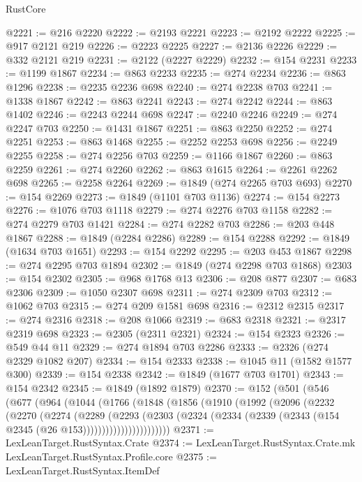 \begin{lexlean}{RustCore}
\begin{coremodule}
@2221 := @216 @2220
@2222 := @2193 @2221
@2223 := @2192 @2222
@2225 := @917 @2121 @219
@2226 := @2223 @2225
@2227 := @2136 @2226
@2229 := @332 @2121 @219
@2231 := @2122 (@2227 @2229)
@2232 := @154 @2231
@2233 := @1199 @1867
@2234 := @863 @2233
@2235 := @274 @2234
@2236 := @863 @1296
@2238 := @2235 @2236 @698
@2240 := @274 @2238 @703
@2241 := @1338 @1867
@2242 := @863 @2241
@2243 := @274 @2242
@2244 := @863 @1402
@2246 := @2243 @2244 @698
@2247 := @2240 @2246
@2249 := @274 @2247 @703
@2250 := @1431 @1867
@2251 := @863 @2250
@2252 := @274 @2251
@2253 := @863 @1468
@2255 := @2252 @2253 @698
@2256 := @2249 @2255
@2258 := @274 @2256 @703
@2259 := @1166 @1867
@2260 := @863 @2259
@2261 := @274 @2260
@2262 := @863 @1615
@2264 := @2261 @2262 @698
@2265 := @2258 @2264
@2269 := @1849 (@274 @2265 @703 @693)
@2270 := @154 @2269
@2273 := @1849 (@1101 @703 @1136)
@2274 := @154 @2273
@2276 := @1076 @703 @1118
@2279 := @274 @2276 @703 @1158
@2282 := @274 @2279 @703 @1421
@2284 := @274 @2282 @703
@2286 := @203 @448 @1867
@2288 := @1849 (@2284 @2286)
@2289 := @154 @2288
@2292 := @1849 (@1634 @703 @1651)
@2293 := @154 @2292
@2295 := @203 @453 @1867
@2298 := @274 @2295 @703 @1894
@2302 := @1849 (@274 @2298 @703 @1868)
@2303 := @154 @2302
@2305 := @968 @1768 @13
@2306 := @208 @877
@2307 := @683 @2306
@2309 := @1050 @2307 @698
@2311 := @274 @2309 @703
@2312 := @1062 @703
@2315 := @274 @209 @1581 @698
@2316 := @2312 @2315
@2317 := @274 @2316
@2318 := @208 @1066
@2319 := @683 @2318
@2321 := @2317 @2319 @698
@2323 := @2305 (@2311 @2321)
@2324 := @154 @2323
@2326 := @549 @44 @11
@2329 := @274 @1894 @703 @2286
@2333 := @2326 (@274 @2329 @1082 @207)
@2334 := @154 @2333
@2338 := @1045 @11 (@1582 @1577 @300)
@2339 := @154 @2338
@2342 := @1849 (@1677 @703 @1701)
@2343 := @154 @2342
@2345 := @1849 (@1892 @1879)
@2370 := @152
    (@501
      (@546
        (@677
          (@964
            (@1044
              (@1766
                (@1848
                  (@1856
                    (@1910
                      (@1992
                        (@2096
                          (@2232
                            (@2270
                              (@2274
                                (@2289
                                  (@2293
                                    (@2303
                                      (@2324
                                        (@2334
                                          (@2339 (@2343 (@154 @2345 (@26 @153)))))))))))))))))))))))
@2371 := LexLeanTarget.RustSyntax.Crate
@2374 := LexLeanTarget.RustSyntax.Crate.mk LexLeanTarget.RustSyntax.Profile.core
@2375 := LexLeanTarget.RustSyntax.ItemDef

\end{coremodule}
\end{lexlean}
